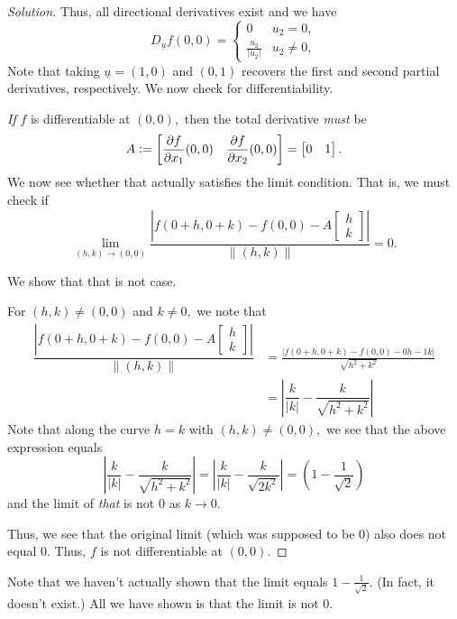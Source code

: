 \documentclass[12pt]{article}
\newcommand{\md}[1]{\left\lvert #1 \right\lvert}
\theoremstyle{definition}
\newenvironment{soln}{\begin{proof}[Solution]}{\end{proof}}
\begin{document}
\begin{itemize}
\begin{soln}
		Thus, all directional derivatives exist and we have
		\begin{equation*} 
			D_{\underline{u}}f(0, 0) = \begin{cases}
				0 & u_2 = 0,\\
				\frac{u_2}{|u_2|} & u_2 \neq 0,
			\end{cases}
		\end{equation*}
		Note that taking $\underline{u} = (1, 0)$ and $(0, 1)$ recovers the first and second partial derivatives, respectively. We now check for differentiability.

		\emph{If} $f$ is differentiable at $(0, 0),$ then the total derivative \emph{must} be 
		\begin{equation*} 
			A \vcentcolon= \begin{bmatrix}
				\dfrac{\partial f}{\partial x_1}(0, 0) &\dfrac{\partial f}{\partial x_2}(0, 0) 
			\end{bmatrix} = \begin{bmatrix}
				0 & 1
			\end{bmatrix}.
		\end{equation*}
		We now see whether that actually satisfies the limit condition. That is, we must check if
		\begin{equation*} 
			\lim_{(h, k)\to (0, 0)} \dfrac{\left|f(0 + h, 0 + k) - f(0, 0) - A\begin{bmatrix}
							h\\
							k
						\end{bmatrix}\right|}{\|(h, k)\|} = 0.
		\end{equation*} 

		We show that that is not case.

		For $(h, k) \neq (0, 0)$ and $k \neq 0,$ we note that
		\begin{align*} 
			\dfrac{\left|f(0 + h, 0 + k) - f(0, 0) - A\begin{bmatrix}
							h\\
							k
						\end{bmatrix}\right|}{\|(h, k)\|} &= \frac{\md{f\left(0+h, 0+k\right)-f\left(0, 0\right)-0 h- 1k}}{\sqrt{h^{2}+k^{2}}}\\
						&= \md{\dfrac{k}{|k|} - \dfrac{k}{\sqrt{h^2 + k^2}}}
		\end{align*}
		Note that along the curve $h = k$ with $(h, k) \neq (0, 0),$ we see that the above expression equals
		\begin{equation*} 
			\md{\dfrac{k}{|k|} - \dfrac{k}{\sqrt{h^2 + k^2}}} = \md{\dfrac{k}{|k|} - \dfrac{k}{\sqrt{2k^2}}} = \left(1 - \dfrac{1}{\sqrt{2}}\right)
		\end{equation*}
		and the limit of \emph{that} is not $0$ as $k \to 0.$

		Thus, we see that the original limit (which was supposed to be $0$) also does not equal $0.$ Thus, $f$ is not differentiable at $(0, 0).$
	\end{soln}
	Note that we haven't actually shown that the limit equals $1 - \frac{1}{\sqrt{2}}.$ (In fact, it doesn't exist.) All we have shown is that the limit is not $0.$
\end{itemize}
\end{document}
